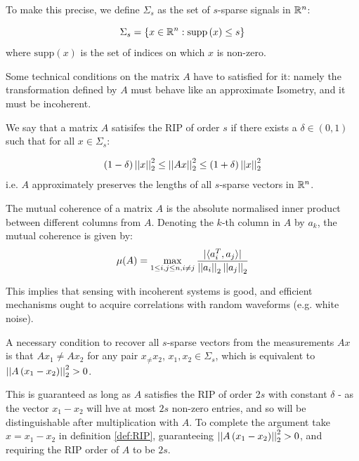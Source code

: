 \documentclass{article}
\begin{document}
To make this precise, we define \(\Sigma_s\) as the set of \(s\)-sparse signals in \({\mathbb{R}}^n\):

\begin{definition}
\begin{equation}
\Sigma_s = \{ x \in {\mathbb{R}}^n : \mathrm{supp}\left(x\right) \leq s\}
\end{equation}
where \(\mathrm{supp}\left(x\right) \) is the set of indices on which \(x\) is non-zero.
\end{definition}

Some technical conditions on the matrix \(A\) have to satisfied for it: namely the transformation defined by \(A\) must behave like an approximate Isometry, and it must be incoherent.

\begin{definition}[RIP]
We say that a matrix \(A\) satisifes the RIP of order \(s\) if there exists a \(\delta \in \left(0, 1\right)\) such that for all \(x \in \Sigma_s\):

\begin{equation}
\left(1 - \delta\right) \left|\left|x\right|\right|_2^2 \leq \left|\left|Ax\right|\right|_2^2 \leq \left(1 + \delta\right) \left|\left|x\right|\right|_2^2
\end{equation}
i.e. \(A\) approximately preserves the lengths of all \(s\)-sparse vectors in \({\mathbb{R}}^n\). 
\label{def:RIP}
\end{definition}

\begin{definition}[Coherence]
The mutual coherence of a matrix \(A\) is the absolute normalised inner product between different columns from \(A\). Denoting the \(k\)-th column in \(A\) by \(a_k\), the mutual coherence is given by:
\begin{equation}
\mu(A) = \max_{1\leq i,j\leq n , i\neq j} \frac{|\langle a^T_i, a_j\rangle|}{\left|\left|a_i\right|\right|_2\left|\left|a_j\right|\right|_2}
\end{equation}
\end{definition}

This implies that sensing with incoherent systems is good, and efficient mechanisms ought to acquire correlations with random waveforms (e.g. white noise).

\begin{remark} 
A necessary condition to recover all \(s\)-sparse vectors from the measurements \(Ax\) is that \(Ax_1 \neq Ax_2\) for any pair \( x_ \neq x_2\), \(x_1, x_2 \in \Sigma_s\), which is equivalent to \(\left|\left|A\left(x_1 - x_2\right)\right|\right|_2^2 > 0\). 

This is guaranteed as long as \(A\) satisfies the RIP of order 2\(s\) with constant \(\delta\) - as the vector \(x_1 - x_2\) will hve at most \(2s\) non-zero entries, and so will be distinguishable after multiplication with \(A\). To complete the argument take \(x = x_1 - x_2\) in definition \eqref{def:RIP}, guaranteeing \(\left|\left|A\left(x_1 - x_2\right)\right|\right|_2^2 > 0 \), and requiring the RIP order of \(A\) to be \(2s\).
\end{remark}
\end{document}
